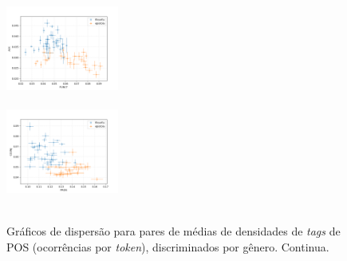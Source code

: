 \documentclass[10pt,a4paper,onecolumn]{article}
\theoremstyle{definition}
\theoremstyle{remark}
\begin{document}
\begin{figure}[htpb!]
\begin{multicols}{3}
		\includegraphics[width=0.33\textwidth]{graficos/AUX_x_PUNCT.png} \\  \\
		\includegraphics[width=0.33\textwidth]{graficos/CCONJ_x_PRON.png} \\  \\
	\end{multicols}\vspace{-0.5cm}
	\caption{Gráficos de dispersão para pares de médias de densidades de \emph{tags} de POS (ocorrências por \emph{token}), discriminados por gênero. Continua.}
	\label{fig:dispersoes1}
\end{figure}
\end{document}
